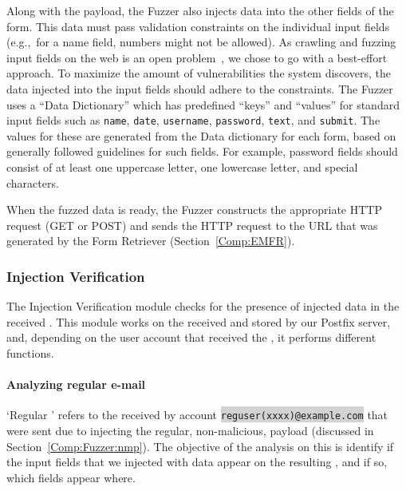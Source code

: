 Along with the payload, the Fuzzer also injects data into the other fields of the form. This data must pass validation constraints on the individual input fields (e.g.,\ for a name field, numbers might not be allowed).  As crawling and fuzzing input fields on the web is an open problem~\cite{raghavan2000crawling}, we chose to go with a best-effort approach. To maximize the amount of vulnerabilities the system discovers, the data injected into the input fields should adhere to the constraints. The Fuzzer uses a ``Data Dictionary'' which has predefined ``keys'' and ``values'' for standard input fields such as \texttt{name}, \texttt{date}, \texttt{username}, \texttt{password}, \texttt{text}, and \texttt{submit}.
The values for these are generated from the Data dictionary for each form, based on generally followed guidelines for such fields. For example, password fields should consist of at least one uppercase letter, one lowercase letter, and special characters.

When the fuzzed data is ready, the Fuzzer constructs the appropriate HTTP request (GET or POST) and sends the HTTP request to the URL that was generated by the \Email Form Retriever (Section~\ref{Comp:EMFR}). 


\subsubsection{Injection Verification}
\label{Comp:EMA}
The Injection Verification module checks for the presence of injected data in the received \emails. This module works on the \emails received and stored by our Postfix server, and, depending on the user account that received the \email, it performs different functions.
\paragraph{Analyzing regular e-mail}
\sloppy
`Regular \email' refers to the \emails received by account \colorbox{lightgray}{\lstinline{reguser(xxxx)@example.com}} that were sent due to injecting the regular, non-malicious, payload (discussed in Section~\ref{Comp:Fuzzer:nmp}). The objective of the analysis on this \email is identify if the input fields that we injected with data appear on the resulting \email, and if so, which fields appear where.

